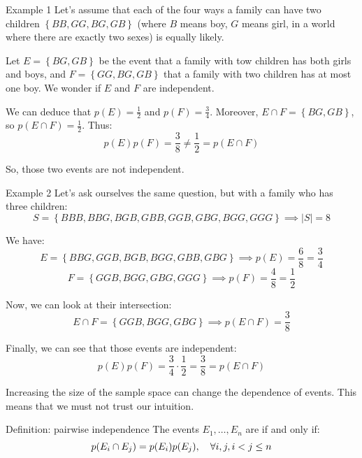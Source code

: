 \documentclass[a4paper]{article}
\begin{document}
\begin{parag}{Example 1}
    Let's assume that each of the four ways a family can have two children $\left\{BB, GG, BG, GB\right\}$ (where $B$ means boy, $G$ means girl, in a world where there are exactly two sexes) is equally likely. 

    Let $E = \left\{BG, GB\right\}$ be the event that a family with tow children has both girls and boys, and $F = \left\{GG, BG, GB\right\}$ that a family with two children has at most one boy. We wonder if $E$ and $F$ are independent.
    
    We can deduce that $p\left(E\right) = \frac{1}{2}$ and $p\left(F\right) = \frac{3}{4}$. Moreover, $E \cap F = \left\{BG, GB\right\}$, so $p\left(E \cap F\right) = \frac{1}{2}$. Thus: 
    \[p\left(E\right) p\left(F\right) = \frac{3}{8} \neq \frac{1}{2} = p\left(E \cap F\right)\]
    
    So, those two events are not independent.
\end{parag}

\begin{parag}{Example 2}
    Let's ask ourselves the same question, but with a family who has three children: 
    \[S = \left\{BBB, BBG, BGB, GBB, GGB, GBG, BGG, GGG\right\} \implies \left|S\right| = 8\]
    

    We have: 
    \[E = \left\{BBG, GGB, BGB, BGG, GBB, GBG\right\} \implies p\left(E\right) = \frac{6}{8} = \frac{3}{4}\]
    \[F = \left\{GGB, BGG, GBG, GGG\right\} \implies p\left(F\right) = \frac{4}{8} = \frac{1}{2}\]

    Now, we can look at their intersection: 
    \[E \cap F = \left\{GGB, BGG, GBG\right\} \implies p\left(E \cap F\right) = \frac{3}{8}\]

    Finally, we can see that those events are independent: 
    \[p\left(E\right) p\left(F\right) = \frac{3}{4} \cdot \frac{1}{2} = \frac{3}{8} = p\left(E \cap F\right)\]

    Increasing the size of the sample space can change the dependence of events. This means that we must not trust our intuition.
\end{parag}

\begin{parag}{Definition: pairwise independence}
    The events $E_1, \ldots, E_n$ are  if and only if: 
    \[p\left(E_i \cap E_j\right) = p\left(E_i\right)p\left(E_j\right), \mathspace \forall i, j, i < j \leq n\]
\end{parag}
\end{document}
